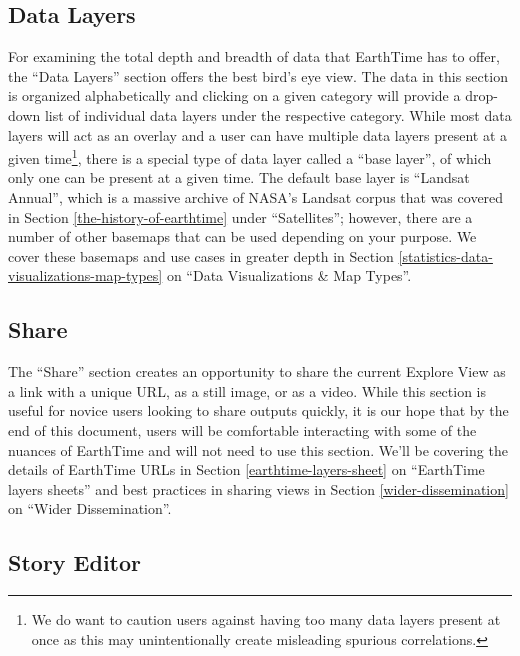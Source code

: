 \documentclass[
]{krantz}
\begin{document}
\hypertarget{data-layers}{%
\subsection*{Data Layers}\label{data-layers}}


For examining the total depth and breadth of data that EarthTime has to offer, the ``Data Layers'' section offers the best bird's eye view. The data in this section is organized alphabetically and clicking on a given category will provide a drop-down list of individual data layers under the respective category. While most data layers will act as an overlay and a user can have multiple data layers present at a given time\footnote{We do want to caution users against having too many data layers present at once as this may unintentionally create misleading spurious correlations.}, there is a special type of data layer called a ``base layer'', of which only one can be present at a given time. The default base layer is ``Landsat Annual'', which is a massive archive of NASA's Landsat corpus that was covered in Section \ref{the-history-of-earthtime} under ``Satellites''; however, there are a number of other basemaps that can be used depending on your purpose. We cover these basemaps and use cases in greater depth in Section \ref{statistics-data-visualizations-map-types} on ``Data Visualizations \& Map Types''.

\hypertarget{share}{%
\subsection*{Share}\label{share}}


The ``Share'' section creates an opportunity to share the current Explore View as a link with a unique URL, as a still image, or as a video. While this section is useful for novice users looking to share outputs quickly, it is our hope that by the end of this document, users will be comfortable interacting with some of the nuances of EarthTime and will not need to use this section. We'll be covering the details of EarthTime URLs in Section \ref{earthtime-layers-sheet} on ``EarthTime layers sheets'' and best practices in sharing views in Section \ref{wider-dissemination} on ``Wider Dissemination''.

\hypertarget{story-editor}{%
\subsection*{Story Editor}\label{story-editor}}
\end{document}
